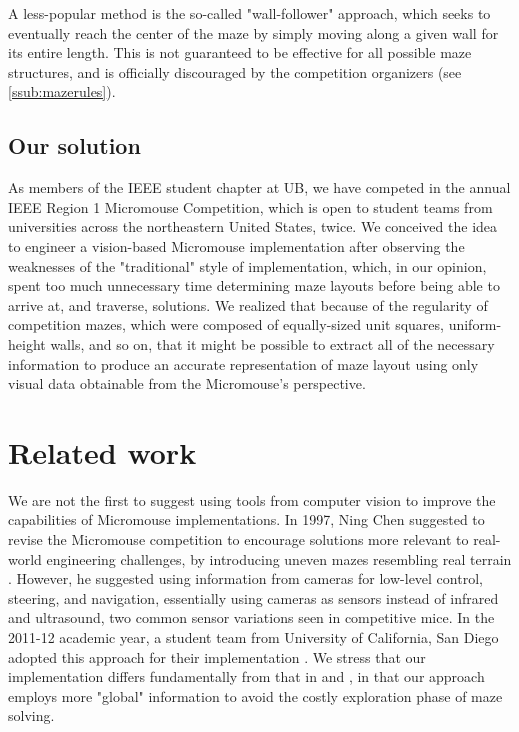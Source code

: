 \documentclass[10pt,twocolumn,letterpaper]{article}
\begin{document}
A less-popular method is the so-called "wall-follower" approach, which seeks to eventually reach the center of the maze
by simply moving along a given wall for its entire length.  This is not guaranteed to be effective for all possible maze
structures, and is officially discouraged by the competition organizers (see \textsection\ref{ssub:mazerules}).

\subsection{Our solution}
\label{sub:oursolution}

As members of the IEEE student chapter at UB, we have competed in the annual IEEE Region 1 Micromouse Competition, which
is open to student teams from universities across the northeastern United States, twice.  We conceived the idea to
engineer a vision-based Micromouse implementation after observing the weaknesses of the "traditional" style of
implementation, which, in our opinion, spent too much unnecessary time determining maze layouts before being able to
arrive at, and traverse, solutions.  We realized that because of the regularity of competition mazes, which were
composed of equally-sized unit squares, uniform-height walls, and so on, that it might be possible to extract all of the
necessary information to produce an accurate representation of maze layout using only visual data obtainable from the
Micromouse's perspective.

\section{Related work}
\label{sec:relatedwork}

We are not the first to suggest using tools from computer vision to improve the capabilities of Micromouse
implementations.  In 1997, Ning Chen suggested to revise the Micromouse competition to encourage solutions more relevant
to real-world engineering challenges, by introducing uneven mazes resembling real terrain \cite{Chen1997}.  However, he
suggested using information from cameras for low-level control, steering, and navigation, essentially using cameras as
sensors instead of infrared and ultrasound, two common sensor variations seen in competitive mice.  In the 2011-12
academic year, a student team from University of California, San Diego adopted this approach for their implementation
\cite{ucsd}.  We stress that our implementation differs fundamentally from that in \cite{Chen1997} and \cite{ucsd}, in that our approach
employs more "global" information to avoid the costly exploration phase of maze solving.
\end{document}
